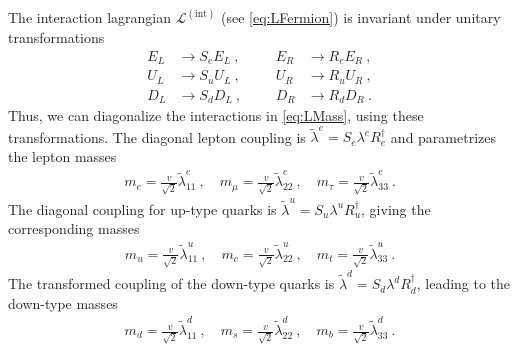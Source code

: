 The interaction lagrangian $\mathcal{L}^{(\text{int})}$ (see \eqref{eq:LFermion}) is invariant under unitary transformations
\begin{align}
	E_L &\rightarrow S_eE_L \ , && &E_R &\rightarrow R_eE_R \ , \\
	U_L &\rightarrow S_uU_L \ , && &U_R &\rightarrow R_uU_R \ , \\
	D_L &\rightarrow S_dD_L \ , && &D_R &\rightarrow R_dD_R \ .
\end{align}
Thus, we can diagonalize the interactions in \eqref{eq:LMass}, using these transformations. The diagonal lepton coupling is $\tilde{\lambda}^e = S_e\lambda^eR_e^\dagger$ and parametrizes the lepton masses
\begin{align}
	m_e = \frac{v}{\sqrt{2}}\tilde{\lambda}_{11}^e \ , \quad m_\mu = \frac{v}{\sqrt{2}}\tilde{\lambda}_{22}^e \ , \quad m_\tau = \frac{v}{\sqrt{2}}\tilde{\lambda}_{33}^e \ .
\end{align}
The diagonal coupling for up-type quarks is $\tilde{\lambda}^u = S_u\lambda^uR_u^\dagger$, giving the corresponding masses
\begin{align}
	m_u = \frac{v}{\sqrt{2}}\tilde{\lambda}_{11}^u \ , \quad m_c = \frac{v}{\sqrt{2}}\tilde{\lambda}_{22}^u \ , \quad m_t = \frac{v}{\sqrt{2}}\tilde{\lambda}_{33}^u \ .
\end{align}
The transformed coupling of the down-type quarks is $\tilde{\lambda}^d = S_d\lambda^dR_d^\dagger$, leading to the down-type masses
\begin{align}
	m_d = \frac{v}{\sqrt{2}}\tilde{\lambda}_{11}^d \ , \quad m_s = \frac{v}{\sqrt{2}}\tilde{\lambda}_{22}^d \ , \quad m_b = \frac{v}{\sqrt{2}}\tilde{\lambda}_{33}^d \ .
\end{align}


